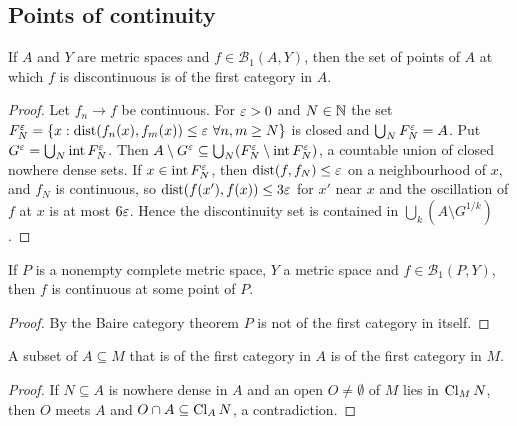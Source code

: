 \subsection{Points of continuity}

\begin{theorem}\label{thm:kuratowski}
If $A$ and $Y$ are metric spaces and $f\in\mathcal B_1(A,Y)$, then the set of points of $A$ at which
$f$ is discontinuous is of the first category in $A$.
\end{theorem}
\begin{proof}
Let $f_n\to f$ be continuous. For $\varepsilon>0$ and $N\in\mathbb{N}$ the set
$F^\varepsilon_N=\{x:\operatorname{dist}(f_n(x),f_m(x))\le\varepsilon\ \forall n,m\ge N\}$ is closed and $\bigcup_NF^\varepsilon_N=A$. Put
$G^\varepsilon=\bigcup_N\operatorname{int} F^\varepsilon_N$. Then $A\setminus G^\varepsilon\subseteq\bigcup_N(F^\varepsilon_N\setminus\operatorname{int}
F^\varepsilon_N)$, a countable union of closed nowhere dense sets. If $x\in\operatorname{int} F^\varepsilon_N$, then
$\operatorname{dist}(f,f_N)\le\varepsilon$ on a neighbourhood of $x$, and $f_N$ is continuous, so
$\operatorname{dist}(f(x'),f(x))\le3\varepsilon$ for $x'$ near $x$ and the oscillation of $f$ at $x$ is at most $6\varepsilon$. Hence the discontinuity set is contained in $\bigcup_k(A\setminus G^{1/k})$.
\end{proof}

\begin{corollary}\label{cor:baire-continuity-point}
If $P$ is a nonempty complete metric space, $Y$ a metric space and $f\in\mathcal B_1(P,Y)$, then $f$ is continuous at some
point of $P$.
\end{corollary}
\begin{proof}
By the Baire category theorem $P$ is not of the first category in itself.
\end{proof}

\begin{lemma}\label{lem:meager-subspace}
A subset of $A\subseteq M$ that is of the first category in $A$ is of the first category in $M$.
\end{lemma}
\begin{proof}
If $N\subseteq A$ is nowhere dense in $A$ and an open $O\ne\emptyset$ of $M$ lies in $\operatorname{Cl}_M N$, then
$O$ meets $A$ and $O\cap A\subseteq\operatorname{Cl}_A N$, a contradiction.
\end{proof}

